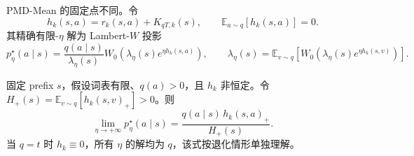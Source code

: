\documentclass[lang=cn,scheme=chinese,openany]{../book/elegantbook}
\begin{document}
PMD-Mean 的固定点不同。令
\begin{equation}
h_k(s,a)=r_k(s,a)+K_{qT,k}(s),
\qquad \mathbb E_{a\sim q}[h_k(s,a)]=0.
\end{equation}
其精确有限-$\eta$ 解为 Lambert-$W$ 投影
\begin{equation}
p^\star_{\eta}(a\mid s)
=\frac{q(a\mid s)}{\lambda_\eta(s)}
W_0\!\left(\lambda_\eta(s)e^{\eta h_k(s,a)}\right),
\qquad
\lambda_\eta(s)=\mathbb E_{v\sim q}
\left[W_0\!\left(\lambda_\eta(s)e^{\eta h_k(s,v)}\right)\right].
\label{eq:ch2-opd-pmd-mean-infinity-prelimit}
\end{equation}

\begin{proposition}
\label{prop:ch2-opd-pmd-mean-infinity}
固定 prefix $s$，假设词表有限、$q(a)>0$，且 $h_k$ 非恒定。令 $H_+(s)=\mathbb E_{v\sim q}[h_k(s,v)_+]>0$。则
\begin{equation}
\lim_{\eta\to+\infty}p^\star_{\eta}(a\mid s)
=\frac{q(a\mid s)\,h_k(s,a)_+}{H_+(s)}.
\label{eq:ch2-opd-pmd-mean-infinity-target}
\end{equation}
当 $q=t$ 时 $h_k\equiv0$，所有 $\eta$ 的解均为 $q$，该式按退化情形单独理解。
\end{proposition}
\end{document}
